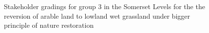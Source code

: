 \documentclass[
  12pt,
  letterpaper,
  DIV=11,
  numbers=noendperiod]{scrartcl}
\begin{document}
\begin{figure}[H]


\caption{\label{fig-SomArMoreG3}Stakeholder gradings for group 3 in the
Somerset Levels for the the reversion of arable land to lowland wet
grassland under bigger principle of nature restoration}

\end{figure}%
\end{document}
